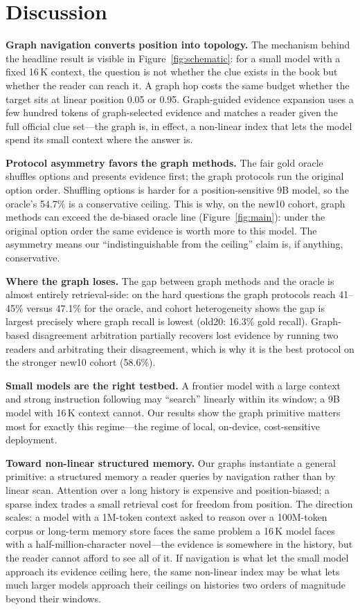 \documentclass{article}
\begin{document}
\section{Discussion}
\label{sec:discussion}

\textbf{Graph navigation converts position into topology.} The mechanism behind
the headline result is visible in Figure~\ref{fig:schematic}: for a small model
with a fixed 16\,K context, the question is not whether the clue exists in the
book but whether the reader can reach it. A graph hop costs the same budget
whether the target sits at linear position 0.05 or 0.95. Graph-guided evidence
expansion uses a few hundred tokens of graph-selected evidence and matches a
reader given the full official clue set---the graph is, in effect, a
non-linear index that lets the model spend its small context where the answer
is.

\textbf{Protocol asymmetry favors the graph methods.} The fair gold oracle
shuffles options and presents evidence first; the graph protocols run the
original option order. Shuffling options is harder for a position-sensitive 9B
model, so the oracle's 54.7\% is a conservative ceiling. This is why, on the
new10 cohort, graph methods can exceed the de-biased oracle line
(Figure~\ref{fig:main}): under the original option order the same evidence is
worth more to this model. The asymmetry means our ``indistinguishable from the
ceiling'' claim is, if anything, conservative.

\textbf{Where the graph loses.} The gap between graph methods and the oracle is
almost entirely retrieval-side: on the hard questions the graph protocols reach
41--45\% versus 47.1\% for the oracle, and cohort heterogeneity shows the gap
is largest precisely where graph recall is lowest (old20: 16.3\% gold recall).
Graph-based disagreement arbitration partially recovers lost evidence by
running two readers and arbitrating their disagreement, which is why it is the
best protocol on the stronger new10 cohort (58.6\%).

\textbf{Small models are the right testbed.} A frontier model with a large
context and strong instruction following may ``search'' linearly within its
window; a 9B model with 16\,K context cannot. Our results show the graph
primitive matters most for exactly this regime---the regime of local,
on-device, cost-sensitive deployment.

\textbf{Toward non-linear structured memory.} Our graphs instantiate a general
primitive: a structured memory a reader queries by navigation rather than by
linear scan. Attention over a long history is expensive and position-biased; a
sparse index trades a small retrieval cost for freedom from position. The
direction scales: a model with a 1M-token context asked to reason over a
100M-token corpus or long-term memory store faces the same problem a 16\,K model
faces with a half-million-character novel---the evidence is somewhere in the
history, but the reader cannot afford to see all of it. If navigation is what
let the small model approach its evidence ceiling here, the same non-linear
index may be what lets much larger models approach their ceilings on histories
two orders of magnitude beyond their windows.
\end{document}
